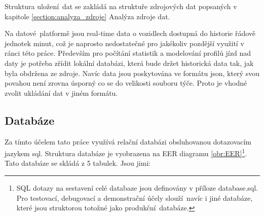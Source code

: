 Struktura uložení dat se zakládá na struktuře zdrojových dat popsaných v kapitole \ref{section:analyza_zdroje} Analýza zdroje dat.

\bigbreak

Na datové platformě jsou real-time data o vozidlech dostupná do historie řádově jednotek minut, což je naprosto nedostatečné pro jakékoliv pozdější využití v ránci této práce. Především pro počítání statistik a modelování profilů jízd nad daty je potřeba zřídit lokální databázi, která bude držet historická data tak, jak byla obdržena ze zdroje. Navíc data jsou poskytována ve formátu \gls{json}, který svou povahou není zrovna úsporný co se do velikosti souboru týče. Proto je vhodné zvolit ukládání dat v jiném formátu.

\subsection{Databáze} \label{subsection:databaze}

Za tímto účelem tato práce využívá relační databázi obsluhovanou dotazovacím jazykem \gls{sql}. Struktura databáze je vyobrazena na EER diagramu \ref{obr:EER}\footnote{SQL dotazy na sestavení celé databaze jsou definovány v příloze database.sql. Pro testovací, debugovací a demonstrační účely slouží navíc i jiné databáze, které jsou struktorou totožné jako produkční databáze.}. Tato databáze se skládá z 5 tabulek. Jsou jimi:


